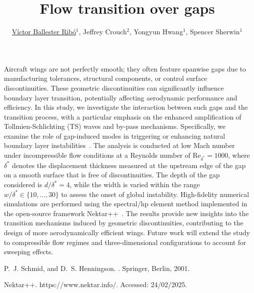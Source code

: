 \documentclass[a4paper,10pt]{article}
\begin{document}
%
%
\title{Flow transition over gaps}
%
\author{\underline{Víctor Ballester Ribó}$^1$, Jeffrey Crouch$^2$, Yongyun Hwang$^1$, Spencer Sherwin$^1$}
\maketitle

%
%

Aircraft wings are not perfectly smooth; they often feature spanwise gaps due to manufacturing tolerances, structural components, or control surface discontinuities. These geometric discontinuities can significantly influence boundary layer transition, potentially affecting aerodynamic performance and efficiency. In this study, we investigate the interaction between such gaps and the transition process, with a particular emphasis on the enhanced amplification of Tollmien-Schlichting (TS) waves and by-pass mechanisms. Specifically, we examine the role of gap-induced modes in triggering or enhancing natural boundary layer instabilities~\cite{schmid_henningson_2001}. The analysis is conducted at low Mach number under incompressible flow conditions at a Reynolds number of $\mathrm{Re}_{\delta^*}=1000$, where $\delta^*$ denotes the displacement thickness measured at the upstream edge of the gap on a smooth surface that is free of discontinuities. The depth of the gap considered is $d/\delta^*=4$, while the width is varied within the range $w/\delta^*\in\{10,\ldots,30\}$ to assess the onset of global instability. High-fidelity numerical simulations are performed using the spectral/hp element method implemented in the open-source framework Nektar++~\cite{nektar}. The results provide new insights into the transition mechanisms induced by geometric discontinuities, contributing to the design of more aerodynamically efficient wings. Future work will extend the study to compressible flow regimes and three-dimensional configurations to account for sweeping effects.
\newline



\begin{thebibliography}{1}
P.~J. Schmid, and D.~S. Henningson.
.
\newblock Springer, Berlin, 2001.

Nektar++.
\newblock https://www.nektar.info/.
\newblock Accessed: 24/02/2025.
\end{thebibliography}
\end{document}
